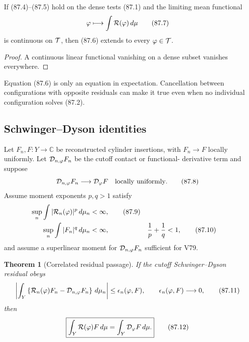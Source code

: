 \documentclass[11pt]{article}
\newtheorem{theorem}{Theorem}[section]
\theoremstyle{remark}
\begin{document}
If (87.4)--(87.5) hold on the dense tests (87.1) and the limiting
mean functional
\[
 \varphi\longmapsto\int{\cal R}(\varphi)\,d\mu              \tag{87.7}
\]
is continuous on \({\cal T}\), then (87.6) extends to every
\(\varphi\in{\cal T}\).

\begin{proof}
A continuous linear functional vanishing on a dense subset vanishes
everywhere.
\end{proof}

Equation (87.6) is only an equation in expectation.  Cancellation
between configurations with opposite residuals can make it true even
when no individual configuration solves (87.2).

\subsection{Schwinger--Dyson identities}

Let \(F_n,F:Y\to\mathbb C\) be reconstructed cylinder insertions,
with \(F_n\to F\) locally uniformly.  Let
\({\cal D}_{n,\varphi}F_n\) be the cutoff contact or functional-
derivative term and suppose
\[
 {\cal D}_{n,\varphi}F_n
 \longrightarrow{\cal D}_{\varphi}F
\quad\text{locally uniformly}.                              \tag{87.8}
\]
Assume moment exponents \(p,q>1\) satisfy
\begin{align}
 \sup_n\int|{\cal R}_n(\varphi)|^p\,d\mu_n&<\infty,          \tag{87.9}\\
 \sup_n\int|F_n|^q\,d\mu_n&<\infty,
 &{1\over p}+{1\over q}&<1,                                \tag{87.10}
\end{align}
and assume a superlinear moment for
\({\cal D}_{n,\varphi}F_n\) sufficient for V79.

\begin{theorem}[Correlated residual passage]
\label{thm:v12v87-SD}
If the cutoff Schwinger--Dyson residual obeys
\begin{equation}
 \left|
 \int_Y\left\{
 {\cal R}_n(\varphi)F_n
 -{\cal D}_{n,\varphi}F_n
 \right\}\,d\mu_n
 \right|
 \leq\epsilon_n(\varphi,F),
 \qquad\epsilon_n(\varphi,F)\longrightarrow0,               \tag{87.11}
\end{equation}
then
\begin{equation}
 \boxed{\displaystyle
 \int_Y{\cal R}(\varphi)F\,d\mu
 =
 \int_Y{\cal D}_{\varphi}F\,d\mu.}                          \tag{87.12}
\end{equation}
\end{theorem}
\end{document}

